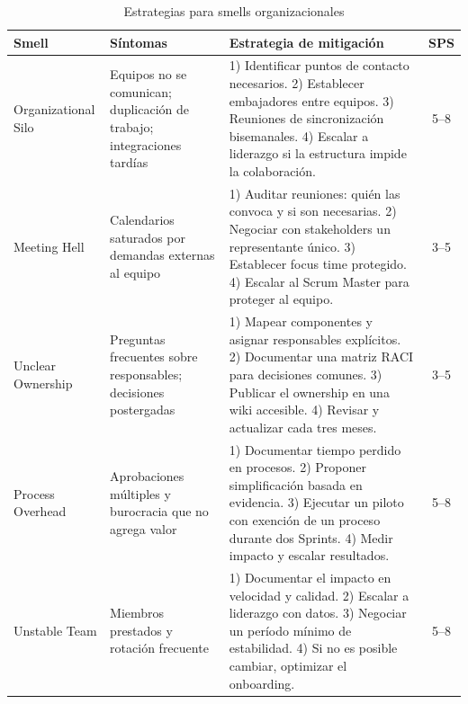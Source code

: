 \begin{table}[h]
    \centering
    \footnotesize
    \begin{tabularx}{\textwidth}{|l|X|X|c|}
        \hline
        \textbf{Smell} & \textbf{Síntomas}                                                      & \textbf{Estrategia de mitigación} & \textbf{SPS} \\
        \hline
        Organizational Silo
                       & Equipos no se comunican; duplicación de trabajo; integraciones tardías
                       & 1) Identificar puntos de contacto necesarios.
        2) Establecer embajadores entre equipos.
        3) Reuniones de sincronización bisemanales.
        4) Escalar a liderazgo si la estructura impide la colaboración.
                       & 5--8                                                                                                                      \\
        \hline
        Meeting Hell
                       & Calendarios saturados por demandas externas al equipo
                       & 1) Auditar reuniones: quién las convoca y si son necesarias.
        2) Negociar con stakeholders un representante único.
        3) Establecer focus time protegido.
        4) Escalar al Scrum Master para proteger al equipo.
                       & 3--5                                                                                                                      \\
        \hline
        Unclear Ownership
                       & Preguntas frecuentes sobre responsables; decisiones postergadas
                       & 1) Mapear componentes y asignar responsables explícitos.
        2) Documentar una matriz RACI para decisiones comunes.
        3) Publicar el ownership en una wiki accesible.
        4) Revisar y actualizar cada tres meses.
                       & 3--5                                                                                                                      \\
        \hline
        Process Overhead
                       & Aprobaciones múltiples y burocracia que no agrega valor
                       & 1) Documentar tiempo perdido en procesos.
        2) Proponer simplificación basada en evidencia.
        3) Ejecutar un piloto con exención de un proceso durante dos Sprints.
        4) Medir impacto y escalar resultados.
                       & 5--8                                                                                                                      \\
        \hline
        Unstable Team
                       & Miembros prestados y rotación frecuente
                       & 1) Documentar el impacto en velocidad y calidad.
        2) Escalar a liderazgo con datos.
        3) Negociar un período mínimo de estabilidad.
        4) Si no es posible cambiar, optimizar el onboarding.
                       & 5--8                                                                                                                      \\
        \hline
    \end{tabularx}
    \caption{Estrategias para smells organizacionales}
    \label{tab:estrategias-organizacionales}
\end{table}

